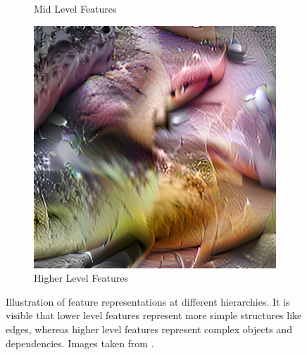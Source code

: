 \begin{figure}[htbp]
\begin{subfigure}[b]{0.25\textwidth}
        \caption{Mid Level Features}
    \end{subfigure}
    \hspace{0.05\textwidth} %
    \begin{subfigure}[b]{0.25\textwidth} %
        \centering
        \includegraphics[width=\textwidth]{figures/featurelayersviz/late_channel.png}
        \caption{Higher Level Features}
    \end{subfigure}
    \caption{Illustration of feature representations at different hierarchies. It is visible that lower level features represent 
    more simple structures like edges, whereas higher level features represent complex objects and dependencies. Images taken from \cite{openaifeaturerepres}.}
    \label{fig:featurelayers}
\end{figure}